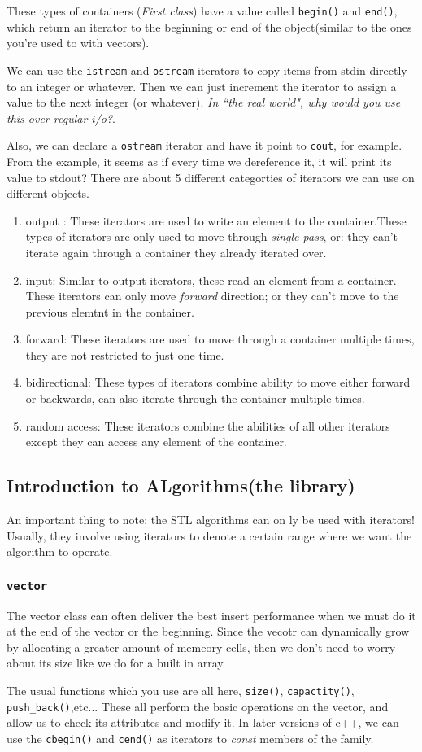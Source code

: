 \documentclass{article}
\begin{document}
These types of containers (\textit{First class}) have a value called \texttt{begin()} and \texttt{end()}, which return
an iterator to the beginning or end of the object(similar to the ones you're used to with vectors).

We can use the \texttt{istream} and \texttt{ostream} iterators to copy items from stdin directly to an integer or whatever.
Then we can just increment the iterator to assign a value to the next integer (or whatever). \textit{In ``the real world", why
would you use this over regular i/o?}.

Also, we can declare a \texttt{ostream} iterator and have it point to \texttt{cout}, for example. From the example, it seems
as if every time we dereference it, it will print its value to stdout? 
There are about 5 different categorties of iterators we can use on different objects. 
\begin{enumerate}
		\item{output }: These iterators are used to write an element to the container.These types of iterators are only used
				to move through \textit{single-pass}, or: they can't iterate again through a container they already iterated
				over.
		\item{input}: Similar to output iterators, these read an element from a container. These iterators can only move 
				\textit{forward} direction; or they can't move to the previous elemtnt in the container.
		\item{forward}: These iterators are used to move through a container multiple times, they are not restricted to just
				one time.
		\item{bidirectional}: These types of iterators combine ability to move either forward or backwards, can also iterate
				through the container multiple times.
		\item{random access}: These iterators combine the abilities of all other iterators except they can access any element 
				of the container.
\end{enumerate}
\subsection{Introduction to ALgorithms(the library)}
An important thing to note: the STL algorithms can on ly be used with iterators! Usually, they involve using iterators to 
denote a certain range where we want the algorithm to operate.
\subsubsection{\texttt{vector}}
The vector class can often deliver the best insert performance when we must do it at the end of the vector or the beginning. 
Since the vecotr can dynamically grow by allocating a greater amount of memeory cells, then we don't need to worry about its 
size like we do for a built in array.

The usual functions which you use are all here, \texttt{size()}, \texttt{capactity()}, \texttt{push\_back()},etc... These 
all perform the basic operations on the vector, and allow us to check its attributes and modify it. In later versions of c++,
we can use the \texttt{cbegin()} and \texttt{cend()} as iterators to \textit{const} members of the family.
\end{document}
